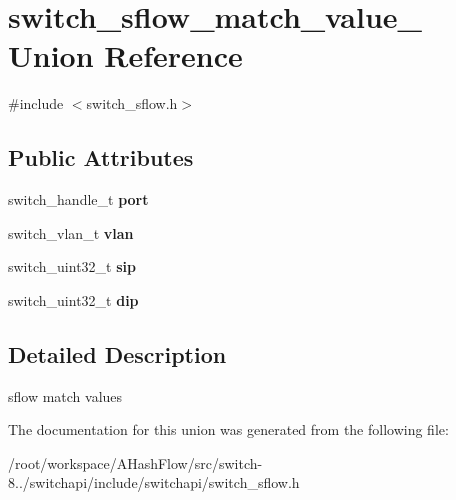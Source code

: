 \hypertarget{unionswitch__sflow__match__value__}{\section{switch\+\_\+sflow\+\_\+match\+\_\+value\+\_\+ Union Reference}
\label{unionswitch__sflow__match__value__}
}


{\ttfamily \#include $<$switch\+\_\+sflow.\+h$>$}

\subsection*{Public Attributes}
\begin{DoxyCompactItemize}
\item 
\hypertarget{unionswitch__sflow__match__value___ae97f4dc88d349ee7f7d699ba08dd9501}{switch\+\_\+handle\+\_\+t {\bfseries port}}\label{unionswitch__sflow__match__value___ae97f4dc88d349ee7f7d699ba08dd9501}

\item 
\hypertarget{unionswitch__sflow__match__value___afb693292ff6b41969e64b30e4e6f0401}{switch\+\_\+vlan\+\_\+t {\bfseries vlan}}\label{unionswitch__sflow__match__value___afb693292ff6b41969e64b30e4e6f0401}

\item 
\hypertarget{unionswitch__sflow__match__value___a7b76fdf4917015cf341dd509ee5997ed}{switch\+\_\+uint32\+\_\+t {\bfseries sip}}\label{unionswitch__sflow__match__value___a7b76fdf4917015cf341dd509ee5997ed}

\item 
\hypertarget{unionswitch__sflow__match__value___aebb7fa061a148abda8e5f6c98b09f985}{switch\+\_\+uint32\+\_\+t {\bfseries dip}}\label{unionswitch__sflow__match__value___aebb7fa061a148abda8e5f6c98b09f985}

\end{DoxyCompactItemize}


\subsection{Detailed Description}
sflow match values 

The documentation for this union was generated from the following file\+:\begin{DoxyCompactItemize}
\item 
/root/workspace/\+A\+Hash\+Flow/src/switch-\/8../switchapi/include/switchapi/switch\+\_\+sflow.\+h\end{DoxyCompactItemize}
